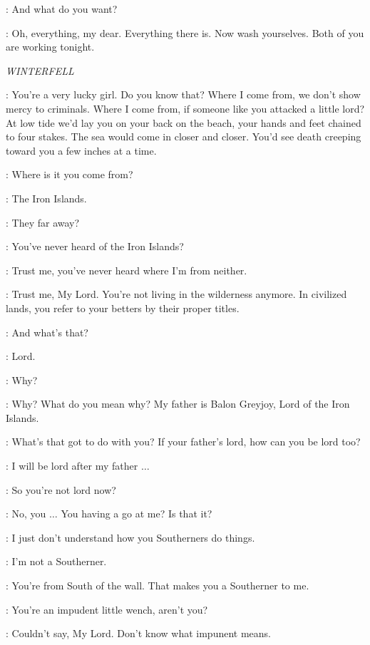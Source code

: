 \ROS: And what do you want? 

\LITTLEFINGER: Oh, everything, my dear. Everything there is. Now wash yourselves. Both of you are working tonight. 


\scene

\textit{WINTERFELL} 


\THEON: You're a very lucky girl. Do you know that? Where I come from, we don't show mercy to criminals. Where I come from, if someone like you attacked a little lord? At low tide we'd lay you on your back on the beach, your hands and feet chained to four stakes. The sea would come in closer and closer. You'd see death creeping toward you a few inches at a time. 

\OSHA: Where is it you come from? 

\THEON: The Iron Islands. 

\OSHA: They far away? 

\THEON: You've never heard of the Iron Islands? 

\OSHA: Trust me, you've never heard where I'm from neither. 

\THEON: Trust me, My Lord. You're not living in the wilderness anymore. In civilized lands, you refer to your betters by their proper titles. 

\OSHA: And what's that? 

\THEON: Lord. 

\OSHA: Why? 

\THEON: Why? What do you mean why? My father is Balon Greyjoy, Lord of the Iron Islands. 

\OSHA: What's that got to do with you? If your father's lord, how can you be lord too? 

\THEON: I will be lord after my father $\ldots$ 

\OSHA: So you're not lord now? 

\THEON: No, you $\ldots$ You having a go at me? Is that it? 

\OSHA: I just don't understand how you Southerners do things. 

\THEON: I'm not a Southerner. 

\OSHA: You're from South of the wall. That makes you a Southerner to me. 

\THEON: You're an impudent little wench, aren't you? 

\OSHA: Couldn't say, My Lord. Don't know what impunent means. 

